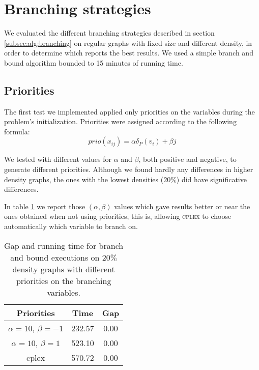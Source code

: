 
\section{Branching strategies}
\label{subsec:resultsbranching}

We evaluated the different branching strategies described in section \ref{subsec:alg:branching} on regular graphs with fixed size and different density, in order to determine which reports the best results. We used a simple branch and bound algorithm bounded to 15 minutes of running time.

\subsection{Priorities}

The first test we implemented applied only priorities on the variables during the problem's initialization. Priorities were assigned according to the following formula:
\begin{equation*}
	prio(x_{ij}) = \alpha \delta_P(v_i) + \beta j
\end{equation*}

We tested with different values for $\alpha$ and $\beta$, both positive and negative, to generate different priorities. Although we found hardly any differences in higher density graphs, the ones with the lowest densities ($20\%$) did have significative differences.

In table \ref{table:branch:static} we report those $(\alpha,\beta)$ values which gave results better or near the ones obtained when not using priorities, this is, allowing \textsc{cplex} to choose automatically which variable to branch on.

\begin{table}[h]
\centering

\begin{tabular}{|c|c|c|}
\hline
\textbf{Priorities} & \textbf{Time} & \textbf{Gap} \\
\hline
$\alpha = 10$, $\beta = -1$ &  232.57 & 0.00 \\
$\alpha = 10$, $\beta = 1$ & 523.10 & 0.00 \\
cplex & 570.72 & 0.00 \\
\hline
 \end{tabular}

\caption{Gap and running time for branch and bound executions on $20\%$ density graphs with different priorities on the branching variables.}
\label{table:branch:static}

\end{table}	

